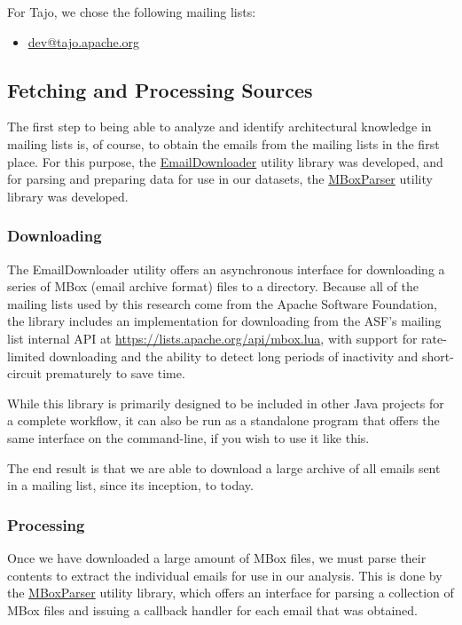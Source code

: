 \documentclass[a4paper, 12pt]{article}
\begin{document}
		For Tajo, we chose the following mailing lists:
		\begin{itemize}
			\item \href{https://lists.apache.org/list.html?dev@tajo.apache.org}{dev@tajo.apache.org}
		\end{itemize}
	
	\subsection{Fetching and Processing Sources}
		The first step to being able to analyze and identify architectural knowledge in mailing lists is, of course, to obtain the emails from the mailing lists in the first place. For this purpose, the \href{https://github.com/ArchitecturalKnowledgeAnalysis/EmailDownloader}{EmailDownloader} utility library was developed, and for parsing and preparing data for use in our datasets, the \href{https://github.com/ArchitecturalKnowledgeAnalysis/MBoxParser}{MBoxParser} utility library was developed.
		
		\subsubsection{Downloading}
			The EmailDownloader utility offers an asynchronous interface for downloading a series of MBox (email archive format) files to a directory. Because all of the mailing lists used by this research come from the Apache Software Foundation, the library includes an implementation for downloading from the ASF's mailing list internal API at \href{https://lists.apache.org/api/mbox.lua}{https://lists.apache.org/api/mbox.lua}, with support for rate-limited downloading and the ability to detect long periods of inactivity and short-circuit prematurely to save time.
			
			While this library is primarily designed to be included in other Java projects for a complete workflow, it can also be run as a standalone program that offers the same interface on the command-line, if you wish to use it like this.
			
			The end result is that we are able to download a large archive of all emails sent in a mailing list, since its inception, to today.
			
		\subsubsection{Processing}
			Once we have downloaded a large amount of MBox files, we must parse their contents to extract the individual emails for use in our analysis. This is done by the \href{https://github.com/ArchitecturalKnowledgeAnalysis/MBoxParser}{MBoxParser} utility library, which offers an interface for parsing a collection of MBox files and issuing a callback handler for each email that was obtained.
			
\end{document}
